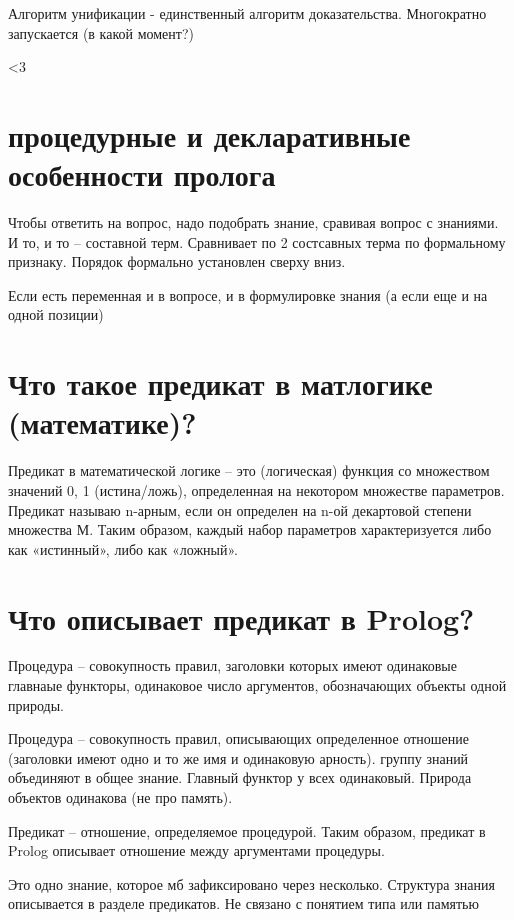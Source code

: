 \documentclass[12pt]{report}
\begin{document}
Алгоритм унификации - единственный алгоритм доказательства. Многократно запускается (в какой момент?)


<3


\section*{процедурные и декларативные особенности пролога}

Чтобы ответить на вопрос, надо подобрать знание, сравивая вопрос с знаниями.  И то, и то -- составной терм. Сравнивает по 2 состсавных терма по формальному признаку. Порядок формально установлен  сверху вниз.

Если есть переменная и в вопросе, и в формулировке знания (а если еще и на одной позиции)



\section{Что такое предикат в матлогике (математике)?}

Предикат в математической логике -- это (логическая) функция со множеством значений {0, 1} (истина/ложь), определенная на некотором множестве параметров. Предикат называю n-арным, если он определен на n-ой декартовой степени множества М. Таким образом, каждый набор параметров характеризуется либо как «истинный», либо как «ложный».


\section*{Что описывает предикат в Prolog?}

Процедура -- совокупность правил, заголовки которых имеют одинаковые главнаые функторы, одинаковое число аргументов, обозначающих объекты одной природы. 

Процедура -- совокупность правил, описывающих определенное отношение (заголовки имеют одно и то же имя и одинаковую арность). группу знаний объединяют в общее знание. Главный функтор у всех одинаковый. Природа объектов одинакова (не про память).


Предикат -- отношение, определяемое процедурой. Таким образом, предикат в Prolog описывает отношение между аргументами процедуры. 




Это одно знание, которое мб зафиксировано через несколько. Структура знания описывается в разделе предикатов. Не связано с понятием типа или памятью
\end{document}
